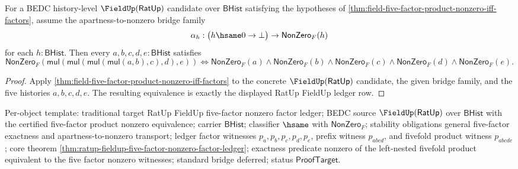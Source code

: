 \begin{theorem}
\label{thm:ratup-fieldup-five-factor-nonzero-factor-ledger}
For a BEDC history-level $\FieldUp(\mathsf{RatUp})$ candidate over
$\mathsf{BHist}$ satisfying the hypotheses of
\autoref{thm:field-five-factor-product-nonzero-iff-factors}, assume the
apartness-to-nonzero bridge family
$$
\alpha_h:\bigl(h\hsame0\to\bot\bigr)\to\mathsf{NonZero}_F(h)
$$
for each $h:\mathsf{BHist}$. Then every $a,b,c,d,e:\mathsf{BHist}$ satisfies
$$
\mathsf{NonZero}_F(
\mathsf{mul}(\mathsf{mul}(\mathsf{mul}(\mathsf{mul}(a,b),c),d),e))
\Longleftrightarrow
\mathsf{NonZero}_F(a)\wedge\mathsf{NonZero}_F(b)\wedge
\mathsf{NonZero}_F(c)\wedge\mathsf{NonZero}_F(d)\wedge
\mathsf{NonZero}_F(e).
$$
\end{theorem}
\begin{proof}
Apply \autoref{thm:field-five-factor-product-nonzero-iff-factors} to the
concrete $\FieldUp(\mathsf{RatUp})$ candidate, the given bridge family, and the
five histories $a,b,c,d,e$. The resulting equivalence is exactly the displayed
RatUp FieldUp ledger row.
\end{proof}

Per-object template: traditional target RatUp FieldUp five-factor nonzero
factor ledger; BEDC source $\FieldUp(\mathsf{RatUp})$ over $\mathsf{BHist}$
with the certified five-factor product nonzero equivalence; carrier
$\mathsf{BHist}$; classifier $\hsame$ with $\mathsf{NonZero}_F$; stability
obligations general five-factor exactness and apartness-to-nonzero transport;
ledger factor witnesses $p_a,p_b,p_c,p_d,p_e$, prefix witness $p_{abcd}$, and
fivefold product witness $p_{abcde}$; core theorem
\autoref{thm:ratup-fieldup-five-factor-nonzero-factor-ledger}; exactness
predicate nonzero of the left-nested fivefold product equivalent to the five
factor nonzero witnesses; standard bridge deferred; status
$\mathsf{ProofTarget}$.

